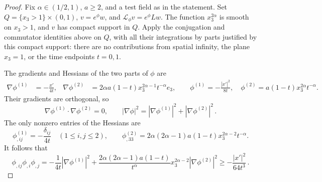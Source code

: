 \documentclass[11pt,letterpaper]{article}
\numberwithin{equation}{section}
\theoremstyle{plain}
\theoremstyle{definition}
\theoremstyle{remark}
\begin{document}
\begin{proof}
Fix $\alpha\in(1/2,1)$, $a\ge2$, and a test field as in the statement. Set $Q=\{x_3>1\}\times(0,1)$, $v=e^\phi w$, and $\mathcal L_\phi v=e^\phi Lw$. The function $x_3^{2\alpha}$ is smooth on $x_3>1$, and $v$ has compact support in $Q$. Apply the conjugation and commutator identities above on $Q$, with all their integrations by parts justified by this compact support: there are no contributions from spatial infinity, the plane $x_3=1$, or the time endpoints $t=0,1$.

The gradients and Hessians of the two parts of $\phi$ are
\begin{align}
 \nabla\phi^{(1)}&=-\frac{x'}{4t},&
 \nabla\phi^{(2)}&=2\alpha a(1-t)x_3^{2\alpha-1}t^{-\alpha}e_3,
 \qquad \phi^{(1)}=-\frac{|x'|^2}{8t},\quad
 \phi^{(2)}=a(1-t)x_3^{2\alpha}t^{-\alpha}.
 \label{eq:carleman-half-gradients}
\end{align}
Their gradients are orthogonal, so
\begin{equation}\label{eq:carleman-half-orthogonal}
 \nabla\phi^{(1)}\cdot\nabla\phi^{(2)}=0,
 \qquad |\nabla\phi|^2=|\nabla\phi^{(1)}|^2+|\nabla\phi^{(2)}|^2\,.
\end{equation}
The only nonzero entries of the Hessians are
\begin{equation}\label{eq:carleman-half-hessians}
 \phi^{(1)}_{,ij}=-\frac{\delta_{ij}}{4t}\quad(1\le i,j\le2),
 \qquad
 \phi^{(2)}_{,33}=2\alpha(2\alpha-1)a(1-t)x_3^{2\alpha-2}t^{-\alpha}.
\end{equation}
It follows that
\begin{equation}\label{eq:carleman-half-hess-grad}
 \phi_{,ij}\phi_{,i}\phi_{,j}
 =-\frac1{4t}|\nabla\phi^{(1)}|^2
  +\frac{2\alpha(2\alpha-1)a(1-t)}{t^\alpha}
       x_3^{2\alpha-2}|\nabla\phi^{(2)}|^2
 \ge-\frac{|x'|^2}{64t^3}\,.
\end{equation}


\end{proof}
\end{document}
